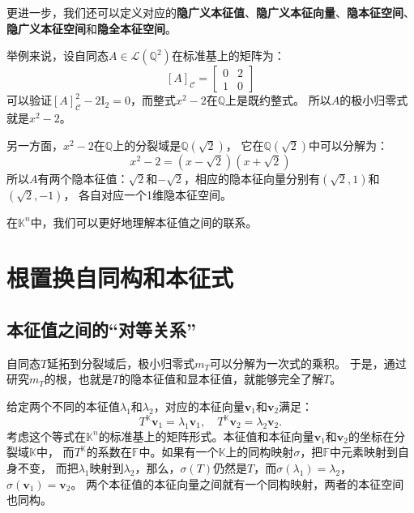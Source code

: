 \documentclass[12pt,UTF8,fontset=none]{ctexbook}
\begin{document}
更进一步，我们还可以定义对应的\textbf{隐广义本征值}、\textbf{隐广义本征向量}、\textbf{隐本征空间}、\textbf{隐广义本征空间}和\textbf{隐全本征空间}。

举例来说，设自同态$A\in\mathcal{L}\left(\mathbb{Q}^2\right)$在标准基上的矩阵为：
$$ [A]_\mathcal{C} = \begin{bmatrix} 0 & 2 \\ 1 & 0 \end{bmatrix}$$
可以验证$[A]_\mathcal{C}^2 - 2\mathrm{I}_2 = 0$，而整式$x^2 - 2$在$\mathbb{Q}$上是既约整式。
所以$A$的极小归零式就是$x^2 - 2$。

另一方面，$x^2 - 2$在$\mathbb{Q}$上的分裂域是$\mathbb{Q}(\sqrt{2})$，
它在$\mathbb{Q}(\sqrt{2})$中可以分解为：
$$ x^2 - 2 = (x - \sqrt{2})(x + \sqrt{2})$$
所以$A$有两个隐本征值：$\sqrt{2}$和$-\sqrt{2}$，相应的隐本征向量分别有$(\sqrt{2}, 1)$和$(\sqrt{2}, -1)$，
各自对应一个1维隐本征空间。

在$\mathbb{K}^n$中，我们可以更好地理解本征值之间的联系。

\section{根置换自同构和本征式}
\subsection{本征值之间的“对等关系”}
自同态$T$延拓到分裂域后，极小归零式$m_T$可以分解为一次式的乘积。
于是，通过研究$m_T$的根，也就是$T$的隐本征值和显本征值，就能够完全了解$T$。

给定两个不同的本征值$\lambda_1$和$\lambda_2$，对应的本征向量$\mathbf{v}_1$和$\mathbf{v}_2$满足：
$$T^{\mathbb{K}}\mathbf{v}_1 = \lambda_1\mathbf{v}_1, \quad T^{\mathbb{K}}\mathbf{v}_2 = \lambda_2 \mathbf{v}_2.$$
考虑这个等式在$\mathbb{K}^n$的标准基上的矩阵形式。本征值和本征向量$\mathbf{v}_1$和$\mathbf{v}_2$的坐标在分裂域$\mathbb{K}$中，
而$T^{\mathbb{K}}$的系数在$\mathbb{F}$中。如果有一个$\mathbb{K}$上的同构映射$\sigma$，把$\mathbb{F}$中元素映射到自身不变，
而把$\lambda_1$映射到$\lambda_2$，那么，$\sigma(T)$仍然是$T$，而$\sigma(\lambda_1) = \lambda_2$，$\sigma(\mathbf{v}_1) = \mathbf{v}_2$。
两个本征值的本征向量之间就有一个同构映射，两者的本征空间也同构。
\end{document}

